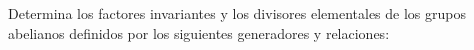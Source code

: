 \question
Determina los factores invariantes y los divisores elementales de los grupos 
abelianos definidos por los siguientes generadores y relaciones:

